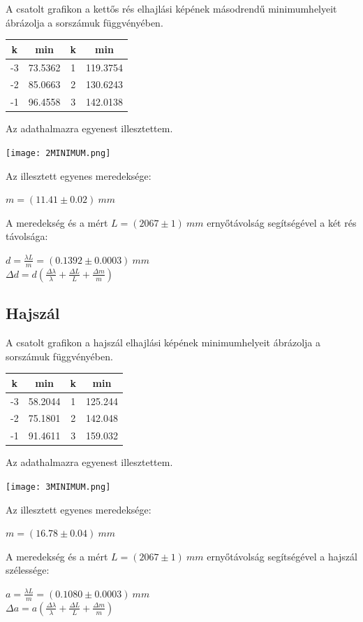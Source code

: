 \documentclass[a4paper,11pt]{article}
\begin{document}
A csatolt grafikon a kettős rés elhajlási képének másodrendű minimumhelyeit ábrázolja a sorszámuk függvényében.
\begin{center}
\begin{tabular}{|c|c|c|c|} \hline
k & min & k & min \\ \hline
-3 & 73.5362 & 1 & 119.3754 \\ \hline
-2 & 85.0663 & 2 & 130.6243 \\ \hline
-1 & 96.4558 & 3 & 142.0138 \\ \hline
\end{tabular}
\end{center}
Az adathalmazra egyenest illesztettem.
\begin{center}
\texttt{[image: 2MINIMUM.png]}
\end{center}
Az illesztett egyenes meredeksége:
\begin{center}
$m=(11.41\pm0.02)~mm$
\end{center}
A meredekség és a mért $L=(2067\pm1)~mm$ ernyőtávolság segítségével a két rés távolsága:
\begin{center}
$d=\frac{\lambda L}{m}=(0.1392\pm0.0003)~mm$
\\
$\Delta d=d(\frac{\Delta \lambda}{\lambda}+\frac{\Delta L}{L}+\frac{\Delta m}{m})$
\end{center}

\subsection{Hajszál}
A csatolt grafikon a hajszál elhajlási képének minimumhelyeit ábrázolja a sorszámuk függvényében.
\begin{center}
\begin{tabular}{|c|c|c|c|} \hline
k & min & k & min \\ \hline
-3 & 58.2044 & 1 & 125.244 \\ \hline
-2 & 75.1801 & 2 & 142.048 \\ \hline
-1 & 91.4611 & 3 & 159.032 \\ \hline
\end{tabular}
\end{center}
Az adathalmazra egyenest illesztettem.
\begin{center}
\texttt{[image: 3MINIMUM.png]}
\end{center}
Az illesztett egyenes meredeksége:
\begin{center}
$m=(16.78\pm0.04)~mm$
\end{center}
A meredekség és a mért $L=(2067\pm1)~mm$ ernyőtávolság segítségével a hajszál szélessége:
\begin{center}
$a=\frac{\lambda L}{m}=(0.1080\pm0.0003)~mm$
\\
$\Delta a=a(\frac{\Delta \lambda}{\lambda}+\frac{\Delta L}{L}+\frac{\Delta m}{m})$
\end{center}
\end{document}
